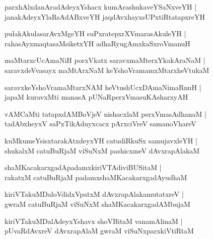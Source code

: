 \documentclass[twoside,12pt,openright]{book}
\newcounter{shloka}[chapter]
\begin{document}
\begin{shloka}%
parxhAlxdanAradAdeyxYshacx kumArashukaveYSaNxveYH |\\
janakAdeyxYlaRsAdABxveYH jaqdAvxhayxsUPxtiRtatapxreYH 
\end{shloka}

\begin{shloka}%
pulakAkulasarAvxMgeYH suPxratepxrXVmarasAkuleYH |\\
rahasAyxmaqtasaMsiketxYH adhaRyugAmxkaSxroVmanuH 
\end{shloka}

\begin{shloka}%
maMtarxcUcAmaNiH porxVkatx saravxmaMterxYkakAraNaM |\\
saravxdeVvasayx maMtArxNaM keYshoVramamxMtarxheVtukaM 
\end{shloka}

\begin{shloka}%
saravxkeYshoVramaMtarxNAM heVtushUcxDAmaNimaRnuH |\\
japaM kuravxMti manasA pUNaRperxVmasuKAsharxyAH 
\end{shloka}

\begin{shloka}%
vAMCaMti tatapxdAMBoVjeV nishacxlaM perxVmasAdhanaM |\\
tadAbxheyxV saPxTikAduyxcacx pArxciVreV samanoVhareV 
\end{shloka}

\begin{shloka}%
kuMkumeYsisxtarakAtxdeyxYH catudiRkuSx samujavxleYH |\\
shukalxM catuBuRjaM viSuNxM pashicxmeV dAvxrapAlakaM 
\end{shloka}

\begin{shloka}%
shaMKacakarxgadApadamxkiriVTAdiviBUSitaM |\\
rakatxM catuBuRjaM padamxshaMKacakarxgadAyudhaM 
\end{shloka}

\begin{shloka}%
kiriVTakuMDaloVdidxVpatxM dAvxrapAlakamutatxreV |\\
gwraM catuBuRjaM viSuNxM shaMKacakarxgadAMbujaM 
\end{shloka}

\begin{shloka}%
kiriVTakuMDalAdeyxYshavx shoVBitaM vanamAlinaM |\\
pUvaRdAvxreV dAvxrapAlaM gwraM viSuNxparxkiVtiRtaM 
\end{shloka}
\end{document}
